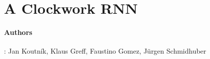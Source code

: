 \section{A Clockwork RNN}
\paragraph{Authors}: Jan Koutník, Klaus Greff, Faustino Gomez, Jürgen Schmidhuber \cite{koutnik_clockwork_2014} \\

